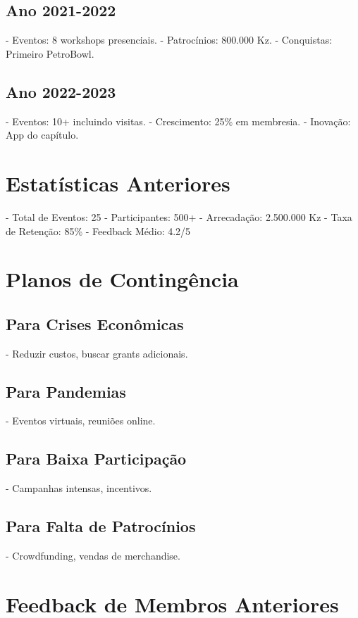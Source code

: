 \documentclass[12pt]{article}
\begin{document}
\subsection{Ano 2021-2022}
- Eventos: 8 workshops presenciais.
- Patrocínios: 800.000 Kz.
- Conquistas: Primeiro PetroBowl.

\subsection{Ano 2022-2023}
- Eventos: 10+ incluindo visitas.
- Crescimento: 25\% em membresia.
- Inovação: App do capítulo.

\section{Estatísticas Anteriores}

- Total de Eventos: 25
- Participantes: 500+
- Arrecadação: 2.500.000 Kz
- Taxa de Retenção: 85\%
- Feedback Médio: 4.2/5

\section{Planos de Contingência}

\subsection{Para Crises Econômicas}
- Reduzir custos, buscar grants adicionais.

\subsection{Para Pandemias}
- Eventos virtuais, reuniões online.

\subsection{Para Baixa Participação}
- Campanhas intensas, incentivos.

\subsection{Para Falta de Patrocínios}
- Crowdfunding, vendas de merchandise.

\section{Feedback de Membros Anteriores}
\end{document}
